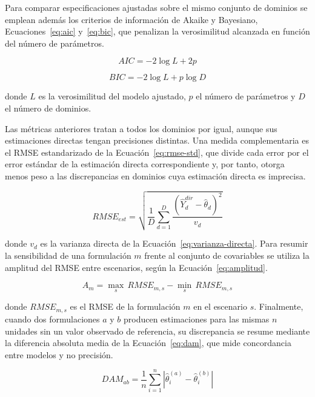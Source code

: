 Para comparar especificaciones ajustadas sobre el mismo conjunto de dominios se emplean además los criterios de información de Akaike y Bayesiano, Ecuaciones~\ref{eq:aic} y~\ref{eq:bic}, que penalizan la verosimilitud alcanzada en función del número de parámetros.

\begin{equation}
    AIC = -2\log L + 2p
    \label{eq:aic}
\end{equation}

\begin{equation}
    BIC = -2\log L + p \log D
    \label{eq:bic}
\end{equation}

\noindent donde $L$ es la verosimilitud del modelo ajustado, $p$ el número de parámetros y $D$ el número de dominios.

Las métricas anteriores tratan a todos los dominios por igual, aunque sus estimaciones directas tengan precisiones distintas. Una medida complementaria es el RMSE estandarizado de la Ecuación~\ref{eq:rmse-std}, que divide cada error por el error estándar de la estimación directa correspondiente y, por tanto, otorga menos peso a las discrepancias en dominios cuya estimación directa es imprecisa.

\begin{equation}
    RMSE_{est} = \sqrt{\frac{1}{D} \sum_{d=1}^{D} \frac{\left(\hat{Y}_d^{dir} - \hat{\theta}_d\right)^2}{v_d}}
    \label{eq:rmse-std}
\end{equation}

\noindent donde $v_d$ es la varianza directa de la Ecuación~\ref{eq:varianza-directa}. Para resumir la sensibilidad de una formulación $m$ frente al conjunto de covariables se utiliza la amplitud del RMSE entre escenarios, según la Ecuación~\ref{eq:amplitud}.

\begin{equation}
    A_m = \max_{s}\, RMSE_{m,s} - \min_{s}\, RMSE_{m,s}
    \label{eq:amplitud}
\end{equation}

\noindent donde $RMSE_{m,s}$ es el RMSE de la formulación $m$ en el escenario $s$. Finalmente, cuando dos formulaciones $a$ y $b$ producen estimaciones para las mismas $n$ unidades sin un valor observado de referencia, su discrepancia se resume mediante la diferencia absoluta media de la Ecuación~\ref{eq:dam}, que mide concordancia entre modelos y no precisión.

\begin{equation}
    DAM_{ab} = \frac{1}{n}\sum_{i=1}^{n}\left|\hat{\theta}_i^{(a)} - \hat{\theta}_i^{(b)}\right|
    \label{eq:dam}
\end{equation}

